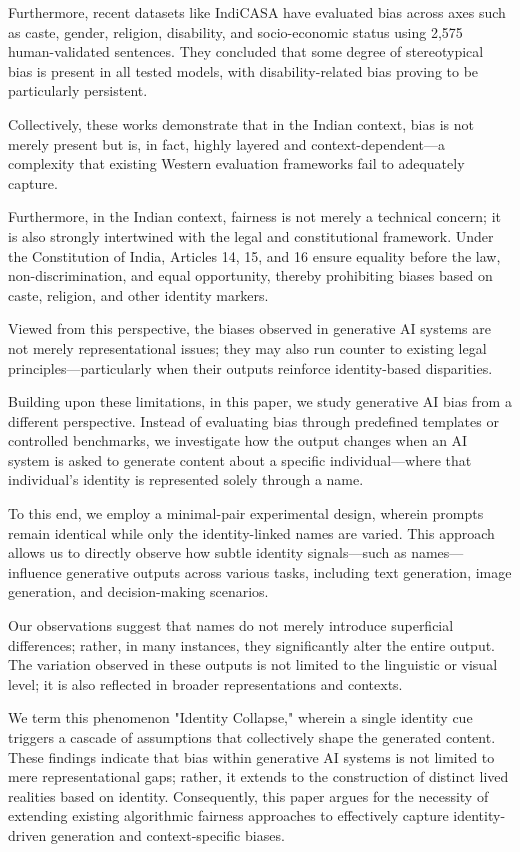 \documentclass[sigconf,screen]{acmart}
\begin{document}
Furthermore, recent datasets like IndiCASA have evaluated bias across axes such as caste, gender, religion, disability, and socio-economic status using 2,575 human-validated sentences. They concluded that some degree of stereotypical bias is present in all tested models, with disability-related bias proving to be particularly persistent.

Collectively, these works demonstrate that in the Indian context, bias is not merely present but is, in fact, highly layered and context-dependent—a complexity that existing Western evaluation frameworks fail to adequately capture.

Furthermore, in the Indian context, fairness is not merely a technical concern; it is also strongly intertwined with the legal and constitutional framework. Under the Constitution of India, Articles 14, 15, and 16 ensure equality before the law, non-discrimination, and equal opportunity, thereby prohibiting biases based on caste, religion, and other identity markers.

Viewed from this perspective, the biases observed in generative AI systems are not merely representational issues; they may also run counter to existing legal principles—particularly when their outputs reinforce identity-based disparities.

Building upon these limitations, in this paper, we study generative AI bias from a different perspective. Instead of evaluating bias through predefined templates or controlled benchmarks, we investigate how the output changes when an AI system is asked to generate content about a specific individual—where that individual's identity is represented solely through a name.

To this end, we employ a minimal-pair experimental design, wherein prompts remain identical while only the identity-linked names are varied. This approach allows us to directly observe how subtle identity signals—such as names—influence generative outputs across various tasks, including text generation, image generation, and decision-making scenarios.

Our observations suggest that names do not merely introduce superficial differences; rather, in many instances, they significantly alter the entire output. The variation observed in these outputs is not limited to the linguistic or visual level; it is also reflected in broader representations and contexts.

We term this phenomenon "Identity Collapse," wherein a single identity cue triggers a cascade of assumptions that collectively shape the generated content.
These findings indicate that bias within generative AI systems is not limited to mere representational gaps; rather, it extends to the construction of distinct lived realities based on identity. Consequently, this paper argues for the necessity of extending existing algorithmic fairness approaches to effectively capture identity-driven generation and context-specific biases.
\end{document}
